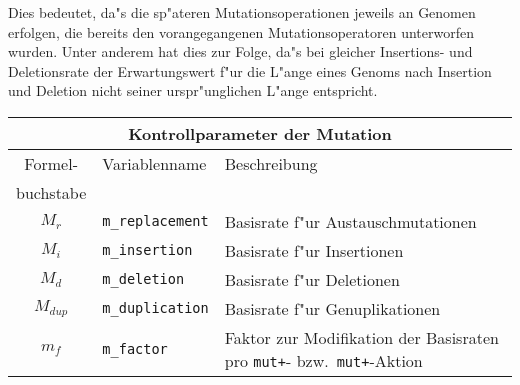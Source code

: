 Dies bedeutet, da"s die sp"ateren Mutationsoperationen jeweils an
Genomen erfolgen, die bereits den vorangegangenen Mutationsoperatoren
unterworfen wurden. Unter anderem hat dies zur Folge, da"s bei gleicher
Insertions- und Deletionsrate der Erwartungswert f"ur die L"ange eines
Genoms nach Insertion und Deletion nicht seiner urspr"unglichen L"ange
entspricht.

\medskip
\noindent\begin{tabularx}{\linewidth}{|c|l|X|} \hline
\multicolumn{3}{|c|}{\bfseries Kontrollparameter der Mutation} \\ \hline
Formel- & Variablenname & Beschreibung \\
buchstabe &              & \\ \hline
$M_r$     & \verb|m_replacement| & Basisrate f"ur Austauschmutationen \\
$M_i$     & \verb|m_insertion|   & Basisrate f"ur Insertionen \\
$M_d$     & \verb|m_deletion|    & Basisrate f"ur Deletionen \\
$M_{\mathit{dup}}$ & \verb|m_duplication| & Basisrate f"ur Genuplikationen \\
$m_f$     & \verb|m_factor|      & Faktor zur Modifikation der Basisraten pro \verb|mut+|- bzw.\ \verb|mut+|-Aktion \\ \hline
\end{tabularx}
\medskip


